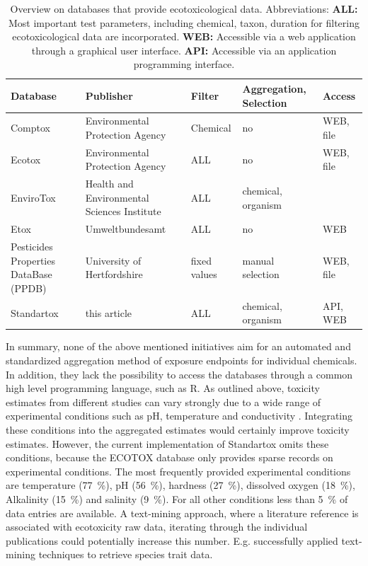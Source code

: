 \documentclass[journal,datadescriptor,accept,moreauthors,pdftex]{Definitions/mdpi}
\begin{document}
\begin{table}[H]
    \caption{Overview on databases that provide ecotoxicological data. Abbreviations: \textbf{ALL:} Most important test parameters, including chemical, taxon, duration for filtering ecotoxicological data are incorporated. \textbf{WEB:} Accessible via a web application through a graphical user interface. \textbf{API:} Accessible via an application programming interface.}
    \label{tab:database-differences}
    \centering
    \begin{tabular}{m{3cm}m{3cm}m{2cm}m{2cm}m{1cm}}
    \toprule
    \textbf{Database} & \textbf{Publisher} & \textbf{Filter} & \textbf{Aggregation, Selection} & \textbf{Access} \\
    \midrule
    Comptox & Environmental Protection Agency & Chemical & no & WEB, file \\
    Ecotox & Environmental Protection Agency & ALL & no & WEB, file \\
    EnviroTox & Health and Environmental Sciences Institute & ALL & chemical, organism \\
    Etox & Umweltbundesamt & ALL & no & WEB \\
    Pesticides Properties DataBase (PPDB) & University of Hertfordshire & fixed values & manual selection & WEB, file \\
    Standartox & this article & ALL & chemical, organism & API, WEB \\
    \bottomrule
\end{tabular}
\end{table}

In summary, none of the above mentioned initiatives aim for an automated and standardized aggregation method of exposure endpoints for individual chemicals. In addition, they lack the possibility to access the databases through a common high level programming language, such as R. As outlined above, toxicity estimates from different studies can vary strongly due to a wide range of experimental conditions such as pH, temperature and conductivity \citep{rosenkrantz_influence_2013, li_temperature_2011}. Integrating these conditions into the aggregated estimates would certainly improve toxicity estimates. However, the current implementation of Standartox omits these conditions, because the ECOTOX database only provides sparse records on experimental conditions. The most frequently provided experimental conditions are temperature (77~\%), pH (56~\%), hardness (27~\%), dissolved oxygen (18~\%), Alkalinity (15~\%) and salinity (9~\%). For all other conditions less than 5~\% of data entries are available. A text-mining approach, where a literature reference is associated with ecotoxicity raw data, iterating through the individual publications could potentially increase this number. E.g. \citet{compson_linking_2018} successfully applied text-mining techniques to retrieve species trait data. 
\end{document}
